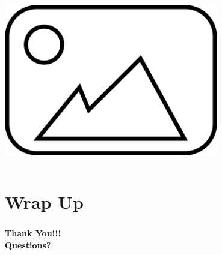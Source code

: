 \documentclass[aspectratio=169,10pt]{beamer}
\begin{document}
\begin{frame}
\begin{columns}[T]
\begin{column}{0.5\textwidth}
            \centering
            \includegraphics[width=0.7\textwidth]{placeholder.png}
            
        \end{column}
    \end{columns}
\end{frame}

\section{Wrap Up}

\begin{frame}
    \frametitle{} %
    \vfill %
    \centering
    {\Huge \textbf{Thank You!!!}}\\
    \vspace{5em}
    {\Huge \textbf{Questions?}}
    \vfill
\end{frame}
\end{document}
